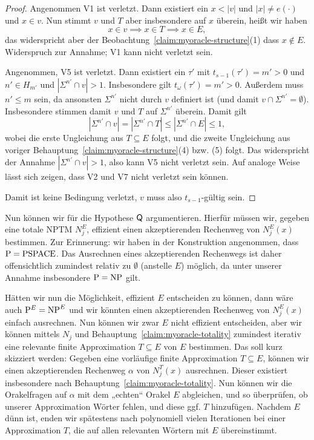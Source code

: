 \begin{proof}
    Angenommen V1 ist verletzt. Dann existiert ein $x<|v|$ und $|x|\neq e(\cdot)$ und $x\in v$.
    Nun stimmt $v$ und $T$ aber insbesondere auf $x$ überein, heißt wir haben
    \[ x\in v \implies x\in T \implies x\in E, \]
    das widerspricht aber der Beobachtung~\ref{claim:myoracle-structure}(1) dass $x\not\in E$.
    Widerspruch zur Annahme; V1 kann nicht verletzt sein.

    Angenommen, V5 ist verletzt. Dann existiert ein $\tau'$ mit $t_{s-1}(\tau')=m'>0$ und $n'\in H_{m'}$ und $|\Sigma^{n'}\cap v|>1$. Insbesondere gilt $t_\omega(\tau')=m'>0$.
    Außerdem muss $n'\leq m$ sein, da ansonsten $\Sigma^{n'}$ nicht durch $v$ definiert ist (und damit $v\cap\Sigma^{n'}=\emptyset$).
    Insbesondere stimmen damit $v$ und $T$ auf $\Sigma^{n'}$ überein.
    Damit gilt
    \[ |\Sigma^{n'}\cap v|=|\Sigma^{n'}\cap T|\leq |\Sigma^{n'}\cap E| \leq 1, \]
    wobei die erste Ungleichung aus $T\subseteq E$ folgt, und die zweite Ungleichung aus voriger Behauptung~\ref{claim:myoracle-structure}(4) bzw. (5) folgt.
    Das widerspricht der Annahme $|\Sigma^{n'}\cap v|>1$, also kann V5 nicht verletzt sein. Auf analoge Weise lässt sich zeigen, dass V2 und V7 nicht verletzt sein können.

    Damit ist keine Bedingung verletzt, $v$ muss also $t_{s-1}$-gültig sein.
\end{proof}

Nun können wir für die Hypothese $\mathsf{Q}$ argumentieren.
Hierfür müssen wir, gegeben eine totale NPTM $N_j^E$, effizient einen akzeptierenden Rechenweg von $N_j^E(x)$ bestimmen.
Zur Erinnerung: wir haben in der Konstruktion angenommen, dass $\mathrm{P}=\mathrm{PSPACE}$.
Das Ausrechnen eines akzeptierenden Rechenwegs ist daher offensichtlich zumindest relativ zu $\emptyset$ (anstelle $E$) möglich, da unter unserer Annahme insbesondere $\mathrm{P}=\mathrm{NP}$ gilt.

Hätten wir nun die Möglichkeit, effizient $E$ entscheiden zu können, dann wäre auch $\mathrm{P}^{E}=\mathrm{NP}^{E}$ und wir könnten einen akzeptierenden Rechenweg von $N_j^E(x)$ einfach ausrechnen.
Nun können wir zwar $E$ nicht effizient entscheiden, aber wir können mittels $N_j$ und Behauptung~\ref{claim:myoracle-totality} zumindest iterativ eine relevante finite Approximation $T\subseteq E$ von $E$ bestimmen.
Das soll kurz skizziert werden: Gegeben eine vorläufige finite Approximation $T\subseteq E$, können wir einen akzeptierenden Rechenweg $\alpha$ von $N_j^T(x)$ ausrechnen. Dieser existiert insbesondere nach Behauptung~\ref{claim:myoracle-totality}. Nun können wir die Orakelfragen auf $\alpha$ mit dem „echten“ Orakel $E$ abgleichen, und so überprüfen, ob unserer Approximation Wörter fehlen, und diese ggf. $T$ hinzufügen. Nachdem $E$ dünn ist,  enden wir spätestens nach polynomiell vielen Iterationen bei einer Approximation $T$, die auf allen relevanten Wörtern mit $E$ übereinstimmt.


